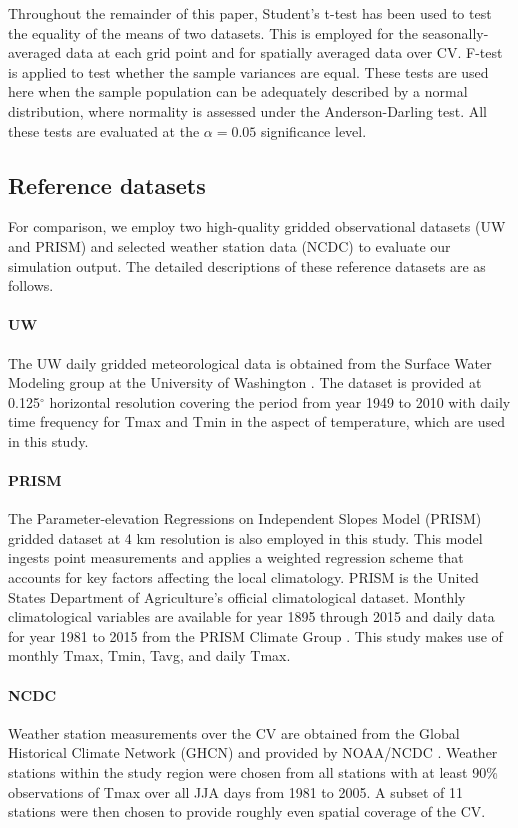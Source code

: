 \documentclass[draft,ms]{agutex}   %
\begin{document}
\begin{article}
Throughout the remainder of this paper, Student's t-test has been used to test the equality of the means of two datasets. This is employed for the seasonally-averaged data at each grid point and for spatially averaged data over CV. F-test is applied to test whether the sample variances are equal. These tests are used here when the sample population can be adequately described by a normal distribution, where normality is assessed under the Anderson-Darling test. All these tests are evaluated at the $\alpha = 0.05$ significance level. 

\subsection{Reference datasets}

For comparison, we employ two high-quality gridded observational datasets (UW and PRISM) and selected weather station data (NCDC) to evaluate our simulation output. The detailed descriptions of these reference datasets are as follows.

\paragraph{UW} The UW daily gridded meteorological data is obtained from the Surface Water Modeling group at the University of Washington \citep{maurer2002long, hamlet2005production}. The dataset is provided at 0.125$^\circ$ horizontal resolution covering the period from year 1949 to 2010 with daily time frequency for Tmax and Tmin in the aspect of temperature, which are used in this study.

\paragraph{PRISM} The Parameter-elevation Regressions on Independent Slopes Model (PRISM) \citep{daly2008physiographically} gridded dataset at 4 km resolution is also employed in this study.  This model ingests point measurements and applies a weighted regression scheme that accounts for key factors affecting the local climatology. PRISM is the United States Department of Agriculture's official climatological dataset. Monthly climatological variables are available for year 1895 through 2015 and daily data for year 1981 to 2015 from the PRISM Climate Group \citep{prismSource}. This study makes use of monthly Tmax, Tmin, Tavg, and daily Tmax.

\paragraph{NCDC} Weather station measurements over the CV are obtained from the Global Historical Climate Network (GHCN) and provided by NOAA/NCDC \citep{menne2012overview}. Weather stations within the study region were chosen from all stations with at least 90$\%$ observations of Tmax over all JJA days from 1981 to 2005.  A subset of 11 stations were then chosen to provide roughly even spatial coverage of the CV.


\end{article}
\end{document}
